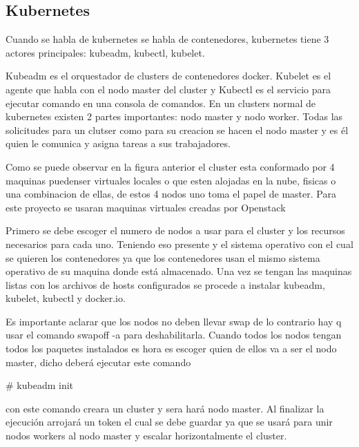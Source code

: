      
     \subsection{Kubernetes}
     Cuando se habla de kubernetes se habla de contenedores, kubernetes tiene 3 actores principales: kubeadm, kubectl, kubelet.
     
     Kubeadm es el orquestador de clusters de contenedores docker.
     Kubelet es el agente que habla con el nodo master del cluster y Kubectl es el servicio para ejecutar comando en una consola de comandos.
 En un  clusters normal  de kubernetes existen 2 partes importantes: nodo master y nodo worker.
 Todas las solicitudes para un clutser como para su creacion se hacen el nodo master y es él quien le comunica y asigna tareas a sus trabajadores.
 
 
      
      Como se puede observar en la figura anterior el cluster esta conformado por 4 maquinas puedenser virtuales locales o que esten alojadas en la nube, fisicas o una combinacion de ellas, de estos 4 nodos uno toma el papel de master. Para este proyecto se usaran maquinas virtuales creadas por Openstack
      
      Primero se debe escoger el numero de nodos a usar para el cluster y los recursos necesarios para cada uno.
      Teniendo eso presente y el sistema operativo con el cual se quieren los contenedores ya que los contenedores usan el mismo sistema operativo de su maquina donde está almacenado.
      Una vez se tengan las maquinas listas con los archivos de hosts configurados se procede a instalar kubeadm, kubelet, kubectl y docker.io.
      
     Es importante aclarar que los nodos no deben llevar swap de lo contrario hay q usar el comando swapoff -a para deshabilitarla.
     Cuando todos los nodos tengan todos los paquetes instalados es hora es escoger quien de ellos va a ser el nodo master, dicho deberá ejecutar este comando
     
     \# kubeadm init
     
     con este comando creara un cluster y sera hará nodo master.
     Al finalizar la ejecución arrojará un token el cual se debe guardar ya que se usará para unir nodos workers al nodo master y escalar horizontalmente el cluster.
     
